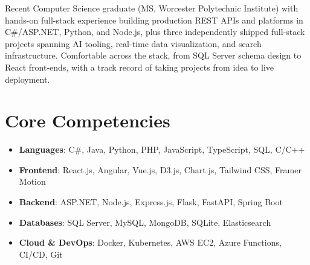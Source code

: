 \documentclass[11pt,a4paper,sans]{moderncv}
\begin{document}
\makecvtitle


\vspace{6pt}
\small{Recent Computer Science graduate (MS, Worcester Polytechnic Institute) with hands-on full-stack experience building production REST APIs and platforms in C\#/ASP.NET, Python, and Node.js, plus three independently shipped full-stack projects spanning AI tooling, real-time data visualization, and search infrastructure. Comfortable across the stack, from SQL Server schema design to React front-ends, with a track record of taking projects from idea to live deployment.}


\section{Core Competencies}
\vspace{1pt}
\begin{itemize}

\item \textbf{Languages}: C\#, Java, Python, PHP, JavaScript, TypeScript, SQL, C/C++

\item \textbf{Frontend}: React.js, Angular, Vue.js, D3.js, Chart.js, Tailwind CSS, Framer Motion

\item \textbf{Backend}: ASP.NET, Node.js, Express.js, Flask, FastAPI, Spring Boot

\item \textbf{Databases}: SQL Server, MySQL, MongoDB, SQLite, Elasticsearch

\item \textbf{Cloud \& DevOps}: Docker, Kubernetes, AWS EC2, Azure Functions, CI/CD, Git

\end{itemize}

\end{document}

